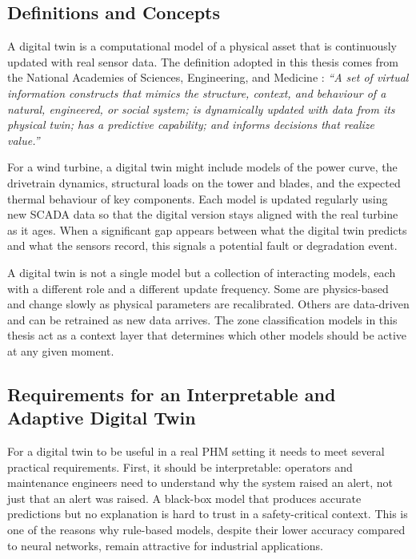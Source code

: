 \subsection{Definitions and Concepts}
\label{subsec:bg:dt:def}

A digital twin is a computational model of a physical asset that is continuously updated
with real sensor data. The definition adopted in this thesis comes from the National
Academies of Sciences, Engineering, and Medicine \citeyearpar{nationalacademies2024}:
\textit{``A set of virtual information constructs that mimics the structure, context, and
behaviour of a natural, engineered, or social system; is dynamically updated with data
from its physical twin; has a predictive capability; and informs decisions
that realize value.''}

For a wind turbine, a digital twin might include models of the power curve, the
drivetrain dynamics, structural loads on the tower and blades, and the expected thermal
behaviour of key components. Each model is updated regularly using new SCADA data so
that the digital version stays aligned with the real turbine as it ages. When a
significant gap appears between what the digital twin predicts and what the sensors
record, this signals a potential fault or degradation event.

A digital twin is not a single model but a collection of interacting models, each with a
different role and a different update frequency. Some are physics-based and change slowly
as physical parameters are recalibrated. Others are data-driven and can be retrained as
new data arrives. The zone classification models in this thesis act as a context layer
that determines which other models should be active at any given moment.

\subsection{Requirements for an Interpretable and Adaptive Digital Twin}
\label{subsec:bg:dt:req}

For a digital twin to be useful in a real PHM setting it needs to meet several practical
requirements. First, it should be interpretable: operators and maintenance engineers need
to understand why the system raised an alert, not just that an alert was raised. A
black-box model that produces accurate predictions but no explanation is hard to trust
in a safety-critical context. This is one of the reasons why rule-based models, despite
their lower accuracy compared to neural networks, remain attractive for industrial
applications.

